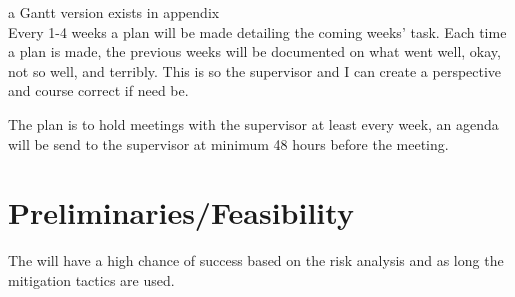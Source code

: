 \documentclass[a4paper,8pt]{article}
\newcommand{\phasey}{Software Evaluation}
\newcommand{\phaseu}{Evaluation}
\begin{document}
\begin{center}
	\end{center}
	{\scriptsize a Gantt version exists in appendix}\\
	Every 1-4 weeks a plan will be made detailing the coming weeks' task. Each time a plan is made, the previous weeks will be documented on what went well, okay, not so well, and terribly. This is so the supervisor and I can create a perspective and course correct if need be.
	
	The plan is to hold meetings with the supervisor at least every week, an agenda will be send to the supervisor at minimum 48 hours before the meeting.

	
	\section{Preliminaries/Feasibility}
		The will have a high chance of success based on the risk analysis and as long the mitigation tactics are used.
	
\end{document}
